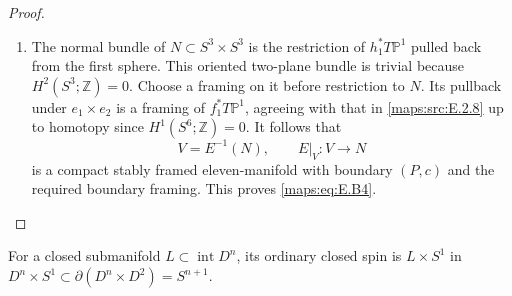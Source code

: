 \begin{proof}
\begin{enumerate}[label={$\langle1\rangle$\arabic*.},leftmargin=*]
\item The normal bundle of $N\subset S^3\times S^3$ is the
restriction of $h_1^*T\mathbb P^1$ pulled back from the first
sphere. This oriented two-plane bundle is trivial because
$H^2(S^3;\mathbb Z)=0$. Choose a framing on it before
restriction to $N$. Its pullback under $e_1\times e_2$
is a framing of $f_1^*T\mathbb P^1$, agreeing with that
in \ref{maps:src:E.2.8} up to homotopy since $H^1(S^6;\mathbb Z)=0$.
It follows that
\[
                  V=E^{-1}(N),\qquad E|_V:V\longrightarrow N
\]
is a compact stably framed eleven-manifold with boundary
$(P,c)$ and the required boundary framing. This proves \eqref{maps:eq:E.B4}.

\end{enumerate}
\end{proof}


\begin{definition}\label{def:V:ordinary-closed-spin}
For a closed
submanifold $L\subset\operatorname{int}D^n$, its ordinary closed
spin is $L\times S^1$ in
$D^n\times S^1\subset\partial(D^n\times D^2)=S^{n+1}$.
\end{definition}

